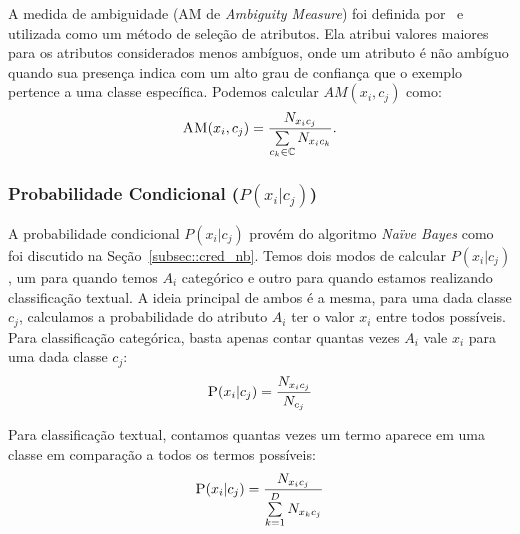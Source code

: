A medida de ambiguidade (AM de \textit{Ambiguity Measure}) foi definida por~\cite{Mengle08} e utilizada como um método de seleção de atributos. Ela atribui valores maiores para os atributos considerados menos ambíguos, onde um atributo é não ambíguo quando sua presença indica com um alto grau de confiança que o exemplo pertence a uma classe específica. Podemos calcular $AM(x_i, c_j)$ como:
\begin{equation}\label{eqn::am}
 \textsc{AM}(x_i, c_j) = \frac{ N_{x_{i}c_{j}}}{\sum\limits_{c_k \in \mathbb{C}} N_{x_{i}c_{k}}}.
\end{equation}

\subsubsection{Probabilidade Condicional ($P(x_i|c_j)$)}
\label{subsubsection::pc}

A probabilidade condicional $P(x_i|c_j)$ provém do algoritmo \textit{Naïve Bayes} como foi discutido na Seção~\ref{subsec::cred_nb}.
Temos dois modos de calcular $P(x_i|c_j)$, um para quando temos $A_i$ categórico e outro para quando estamos realizando classificação textual.
A ideia principal de ambos é a mesma, para uma dada classe $c_j$, calculamos a probabilidade do atributo $A_i$ ter o valor $x_i$ entre todos possíveis. 
Para classificação categórica, basta apenas contar quantas vezes $A_i$ vale $x_i$ para uma dada classe $c_j$:
    \begin{equation}\label{eqn::nbcattexto}
        \textsc{P}(x_i|c_j) = \frac{ N_{x_{i}c_{j}} }{ N_{c_{j}} } 
    \end{equation}
        
Para classificação textual, contamos quantas vezes um termo aparece em uma classe em comparação a todos os termos possíveis:
    \begin{equation}\label{eqn::nbcattexto}
       \textsc{P}(x_i|c_j) = \frac{ N_{x_{i}c_{j}} }{ \sum\limits^{D}_{k = 1} {  N_{x_{k}c_{j}}} } 
    \end{equation}

